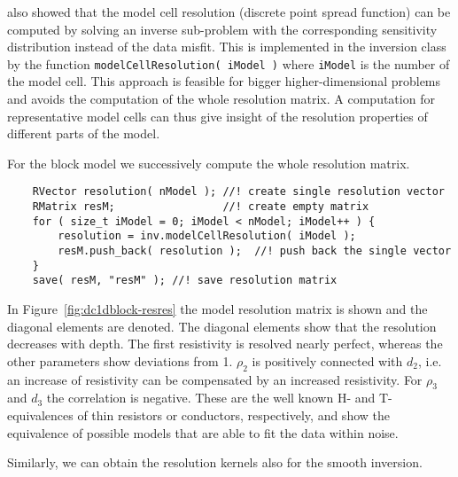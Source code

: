 \citet{guentherdiss} also showed that the model cell resolution (discrete point spread function) can be computed by solving an inverse sub-problem with the corresponding sensitivity distribution instead of the data misfit.
This is implemented in the inversion class by the function \lstinline|modelCellResolution( iModel )| where \lstinline|iModel| is the number of the model cell.
This approach is feasible for bigger higher-dimensional problems and avoids the computation of the whole resolution matrix.
A computation for representative model cells can thus give insight of the resolution properties of different parts of the model.

For the block model we successively compute the whole resolution matrix.
\begin{lstlisting}
    RVector resolution( nModel ); //! create single resolution vector
    RMatrix resM;                 //! create empty matrix 
    for ( size_t iModel = 0; iModel < nModel; iModel++ ) {
        resolution = inv.modelCellResolution( iModel );
        resM.push_back( resolution );  //! push back the single vector
    }
    save( resM, "resM" ); //! save resolution matrix
\end{lstlisting}

In Figure~\ref{fig:dc1dblock-resres} the model resolution matrix is shown and the diagonal elements are denoted.
The diagonal elements show that the resolution decreases with depth.
The first resistivity is resolved nearly perfect, whereas the other parameters show deviations from 1.
$\rho_2$ is positively connected with $d_2$, i.e. an increase of resistivity can be compensated by an increased resistivity.
For $\rho_3$ and $d_3$ the correlation is negative.
These are the well known H- and T-equivalences of thin resistors or conductors, respectively, and show the equivalence of possible models that are able to fit the data within noise.

Similarly, we can obtain the resolution kernels also for the smooth inversion.

